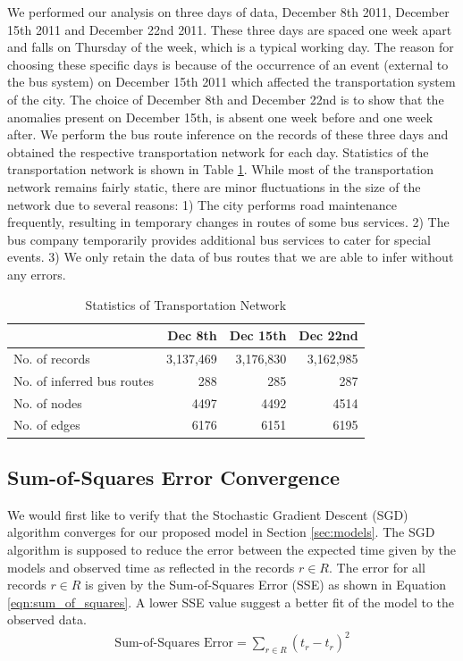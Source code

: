 \documentclass{sig-alternate}
\begin{document}
We performed our analysis on three days of data, December 8th 2011, December 15th 2011 and December 22nd 2011. These three days are spaced one week apart and falls on Thursday of the week, which is a typical working day. The reason for choosing these specific days is because of the occurrence of an event (external to the bus system) on December 15th 2011 which affected the transportation system of the city. The choice of December 8th and December 22nd is to show that the anomalies present on December 15th, is absent one week before and one week after. We perform the bus route inference on the records of these three days and obtained the respective transportation network for each day. Statistics of the transportation network is shown in Table \ref{tbl:statistics}. While most of the transportation network remains fairly static, there are minor fluctuations in the size of the network due to several reasons: 1) The city performs road maintenance frequently, resulting in temporary changes in routes of some bus services. 2) The bus company temporarily provides additional bus services to cater for special events. 3) We only retain the data of bus routes that we are able to infer without any errors.
\begin{table}[htb]
	\centering
	\caption{Statistics of Transportation Network}
	\label{tbl:statistics}
	\begin{tabular}{|p{2.1cm}|r|r|r|}
		\hline
			& Dec 8th & Dec 15th & Dec 22nd \\
		\hline
		No. of records & 3,137,469 & 3,176,830 & 3,162,985 \\
		\hline
		No. of inferred bus routes & 288 & 285 & 287 \\
		\hline
		No. of nodes & 4497 & 4492 & 4514 \\
		\hline
		No. of edges & 6176 & 6151 & 6195 \\
		\hline
	\end{tabular}
\end{table}

\subsection{Sum-of-Squares Error Convergence}

We would first like to verify that the Stochastic Gradient Descent (SGD) algorithm converges for our proposed model in Section \ref{sec:models}. The SGD algorithm is supposed to reduce the error between the expected time given by the models and observed time as reflected in the records $r \in R$. The error for all records $r \in R$ is given by the Sum-of-Squares Error (SSE) as shown in Equation \ref{eqn:sum_of_squares}. A lower SSE value suggest a better fit of the model to the observed data.
\begin{align}
	\label{eqn:sum_of_squares}
	\text{Sum-of-Squares Error} = \sum_{r \in R} (t_r - \hat{t}_r)^2 
\end{align}
\end{document}
